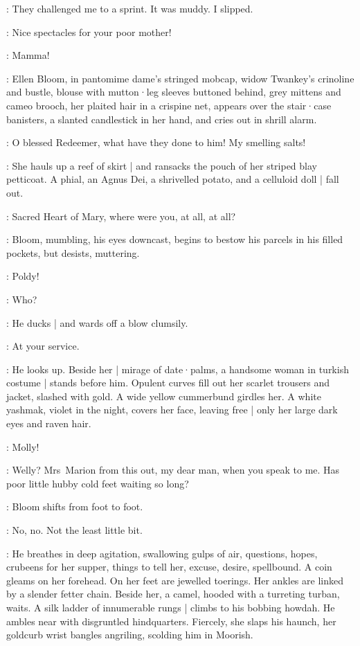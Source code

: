\Bloom:
They challenged me to a sprint.
It was muddy.
I slipped.

\Rudolph:
Nice spectacles for your poor mother!

\Bloom:
Mamma!

:
Ellen Bloom,
in pantomime dame's stringed mobcap,
widow Twankey's crinoline and bustle,
blouse with mutton·leg sleeves buttoned behind,
grey mittens and cameo brooch,
her plaited hair in a crispine net,
appears over the stair·case banisters,
a slanted candlestick in her hand,
and cries out in shrill alarm.

\Ellen:
O blessed Redeemer,
what have they done to him!
My smelling salts!

:
She hauls up a reef of skirt |
and ransacks the pouch of her striped blay petticoat.
A phial,
an Agnus Dei,
a shrivelled potato,
and a celluloid doll |
fall out.

\Ellen:
Sacred Heart of Mary,
where were you,
at all,
at all?

:
Bloom,
mumbling,
his eyes downcast,
begins to bestow his parcels in his filled pockets,
but desists,
muttering.

\Marion:
Poldy!

\Bloom:
Who?

:
He ducks |
and wards off a blow clumsily.

\Bloom:
At your service.

:
He looks up.
Beside her |
mirage of date·palms,
a handsome woman in turkish costume |
stands before him.
Opulent curves fill out her scarlet trousers and jacket,
slashed with gold.
A wide yellow cummerbund girdles her.
A white yashmak,
violet in the night,
covers her face,
leaving free |
only her large dark eyes and raven hair.

\Bloom:
Molly!

\Marion[1]:
Welly?
Mrs~Marion from this out,
my dear man,
when you speak to me.
Has poor little hubby cold feet waiting so long?

:
Bloom shifts from foot to foot.

\Bloom:
No,
no.
Not the least little bit.

:
He breathes in deep agitation,
swallowing gulps of air,
questions,
hopes,
crubeens for her supper,
things to tell her,
excuse,
desire,
spellbound.
A coin gleams on her forehead.
On her feet are jewelled toerings.
Her ankles are linked by a slender fetter chain.
Beside her,
a camel,
hooded with a turreting turban,
waits.
A silk ladder of innumerable rungs |
climbs to his bobbing howdah.
He ambles near with disgruntled hindquarters.
Fiercely,
she slaps his haunch,
her goldcurb wrist bangles angriling,
scolding him in Moorish.

